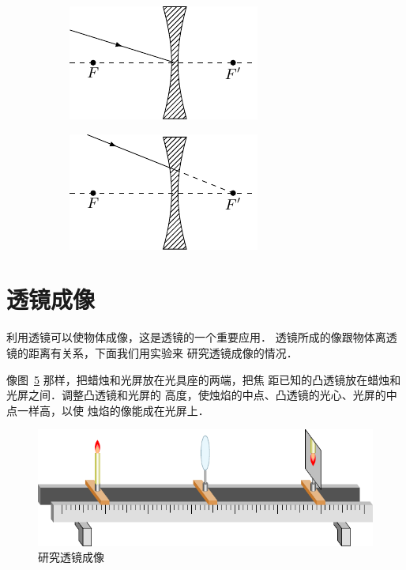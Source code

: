 \begin{figure}[htbp]
\begin{subfigure}{0.3\linewidth}
        \caption{}\label{fig_C_5-37c}
    \end{subfigure}
    \hfill
    \begin{subfigure}{0.3\linewidth}
        \centering
        \includegraphics{fig/C/5-37d.pdf}
        \caption{}\label{fig_C_5-37d}
    \end{subfigure}
    \hfill
    \begin{subfigure}{0.3\linewidth}
        \centering
        \includegraphics{fig/C/5-37e.pdf}
        \caption{}\label{fig_C_5-37e}
    \end{subfigure}
    \caption{}\label{fig_C_5-37}
\end{figure}

\section{透镜成像}
利用透镜可以使物体成像，这是透镜的一个重要应用．
透镜所成的像跟物体离透镜的距离有关系，下面我们用实验来
研究透镜成像的情况．

像图~\ref{fig_C_5-38} 那样，把蜡烛和光屏放在光具座的两端，把焦
距已知的凸透镜放在蜡烛和光屏之间．调整凸透镜和光屏的
高度，使烛焰的中点、凸透镜的光心、光屏的中点一样高，以使
烛焰的像能成在光屏上．
\begin{figure}[htbp]
    \centering
    \includegraphics{fig/C/5-38.pdf}
    \caption{研究透镜成像}\label{fig_C_5-38}
\end{figure}

